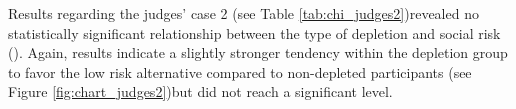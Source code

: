 Results regarding the judges’ case 2 (see Table \ref{tab:chi_judges2})revealed no statistically significant relationship between the type of depletion and social risk (). Again, results indicate a slightly stronger tendency within the depletion group to favor the low risk alternative compared to non-depleted participants (see Figure \ref{fig:chart_judges2})but did not reach a significant level.\par

\begin{figure}[!h]
\begin{floatrow}
\capbfigbox{%

}
\end{floatrow}
\end{figure}
